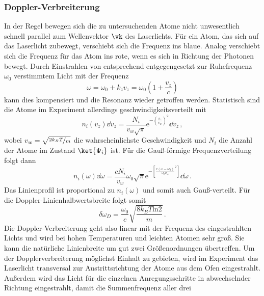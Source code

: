 \subsubsection{Doppler-Verbreiterung}\label{subsubsec:doppler-verbreiterung}
In der Regel bewegen sich die zu untersuchenden Atome nicht unwesentlich schnell
parallel zum Wellenvektor $\vk$ des Laserlichts. Für ein Atom, das sich auf das
Laserlicht zubewegt, verschiebt sich die Frequenz ins blaue. Analog verschiebt
sich die Frequenz für das Atom ins rote, wenn es sich in Richtung der
Photonen bewegt. Durch Einstrahlen von entsprechend entgegengesetzt zur
Ruhefrequenz $\omega_0$ verstimmtem Licht mit der Frequenz
\begin{equation}\label{eq:doppler}
	\omega=\omega_0+k_zv_z=\omega_0\left(1+\frac{v_z}{c}\right)
\end{equation}
kann dies kompensiert und die Resonanz wieder getroffen werden. Statistisch sind
die Atome im Experiment allerdings geschwindigkeitsverteilt
\cite{demtroeder:laserspektroskopie} mit
\begin{equation}\label{eq:boltzmann-verteilung_v}
	n_i(v_z)\dd{v_z}=\frac{N_i}{v_w\sqrt{\pi}}\mathrm{e}^{-\left(\frac{v_z}{v_w}\right)^2}\dd{v_z}\,,
\end{equation}
wobei $v_w=\sqrt{\nicefrac{2k_BT}{m}}$ die wahrscheinlichste Geschwindigkeit und
$N_i$ die Anzahl der Atome im Zustand $\ket{\Psi_i}$ ist. Für die Gauß-förmige
Frequenzverteilung folgt dann
\begin{equation}\label{eq:boltzmann-verteilung_omega}
	n_i(\omega)\dd\omega=\frac{cN_i}{v_w}\omega_0\sqrt{\pi}\mathrm{e}^{-\left[\frac{c(\omega-\omega_0)}{\omega_0v_w}^2\right]}\dd\omega\,.
\end{equation}
Das Linienprofil ist proportional zu $n_i(\omega)$ und somit auch Gauß-verteilt.
Für die Doppler-Linienhalbwertsbreite folgt somit  
\begin{equation}\label{eq:doppler-breite}
	\delta\omega_D=\frac{\omega_0}{c}\sqrt{\frac{8k_BT\mathrm{ln}2}{m}}\,.
\end{equation}
Die Doppler-Verbreiterung geht also linear mit der Frequenz des eingestrahlten
Lichts und wird bei hohen Temperaturen und leichten Atomen sehr groß. Sie kann
die natürliche Linienbreite um gut zwei Größenordnungen übertreffen. Um der
Dopplerverbreiterung möglichst Einhalt zu gebieten, wird im Experiment das
Laserlicht transversal zur Austrittsrichtung der Atome aus dem Ofen
eingestrahlt. Außerdem wird das Licht für die einzelnen Anregungsschritte in
abwechselnder Richtung eingestrahlt, damit die Summenfrequenz aller drei

